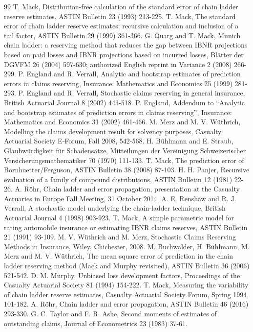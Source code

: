 \begin{thebibliography}{99}
 T. Mack, Distribution-free calculation of the standard error of chain ladder reserve estimates, ASTIN Bulletin 23 (1993) 213-225.
 T. Mack, The standard error of chain ladder reserve estimates: recursive calculation and inclusion of a tail factor, ASTIN Bulletin 29 (1999) 361-366.
 G. Quarg and T. Mack, Munich chain ladder: a reserving method that reduces the gap between IBNR projections based on paid losses and IBNR projections based on incurred losses, Blätter der DGVFM 26 (2004) 597-630; authorized English reprint in Variance 2 (2008) 266-299.
 P. England and R. Verrall, Analytic and bootstrap estimates of prediction errors in claims reserving, Insurance: Mathematics and Economics 25 (1999) 281-293.
 P. England and R. Verrall, Stochastic claims reserving in general insurance, British Actuarial Journal 8 (2002) 443-518.
 P. England, Addendum to ``Analytic and bootstrap estimates of prediction errors in claims reserving'', Insurance: Mathematics and Economics 31 (2002) 461-466.
 M. Merz and M. V. W\"uthrich, Modelling the claims development result for solvency purposes, Casualty Actuarial Society E-Forum, Fall 2008, 542-568.
 H. B\"uhlmann and E. Straub, Glaubw\"urdigkeit f\"ur Schadens\"atze, Mitteilungen der Vereinigung Schweizerischer Versicherungsmathematiker 70 (1970) 111-133.
 T. Mack, The prediction error of Bornhuetter/Ferguson, ASTIN Bulletin 38 (2008) 87-103.
 H. H. Panjer, Recursive evaluation of a family of compound distributions, ASTIN Bulletin 12 (1981) 22-26.
 A. R\"ohr, Chain ladder and error propagation, presentation at the Casualty Actuaries in Europe Fall Meeting, 31 October 2014.
 A. E. Renshaw and R. J. Verrall, A stochastic model underlying the chain-ladder technique, British Actuarial Journal 4 (1998) 903-923.
 T. Mack, A simple parametric model for rating automobile insurance or estimating IBNR claims reserves, ASTIN Bulletin 21 (1991) 93-109.
 M. V. W\"uthrich and M. Merz, Stochastic Claims Reserving Methods in Insurance, Wiley, Chichester, 2008.
 M. Buchwalder, H. B\"uhlmann, M. Merz and M. V. W\"uthrich, The mean square error of prediction in the chain ladder reserving method (Mack and Murphy revisited), ASTIN Bulletin 36 (2006) 521-542.
 D. M. Murphy, Unbiased loss development factors, Proceedings of the Casualty Actuarial Society 81 (1994) 154-222.
 T. Mack, Measuring the variability of chain ladder reserve estimates, Casualty Actuarial Society Forum, Spring 1994, 101-182.
 A. R\"ohr, Chain ladder and error propagation, ASTIN Bulletin 46 (2016) 293-330.
 G. C. Taylor and F. R. Ashe, Second moments of estimates of outstanding claims, Journal of Econometrics 23 (1983) 37-61.
\end{thebibliography}
